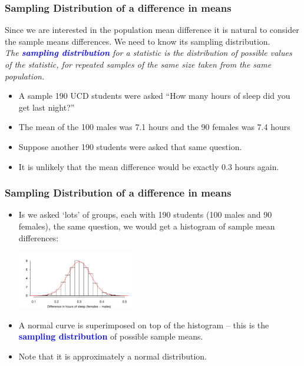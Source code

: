 \documentclass[12pt,xcolor=dvipsnames,handout,mathserif,aspectratio=169]{beamer}
\newcommand{\tcb}{\textcolor{blue}}
\begin{document}
\begin{frame}
\frametitle{Sampling Distribution of a difference in means}
Since we are interested in the population mean difference it is natural to consider the sample means differences. We need to know its sampling distribution.\\
\vspace*{0.2cm}
\emph{The \textbf{\tcb{sampling distribution}} for a statistic is the distribution of possible values 
of the statistic, for repeated samples of the same size taken from the same population.}\\
\vspace*{0.2cm}
\begin{itemize}
\item A sample 190 UCD students were asked ``How many hours of sleep did you 
get last night?''
\item The mean of the 100 males was 7.1 hours and the 90 females was 7.4 hours
\item Suppose another 190 students were asked that same question. 
\item It is unlikely that the mean difference would be exactly 0.3 hours again.
\end{itemize}
\end{frame}

\begin{frame}
\frametitle{Sampling Distribution of a difference in means}
\begin{itemize}
\item Is we asked `lots' of groups, each with 190 students (100 males and 90 females), the same question, we would get a histogram  of sample mean differences:

\begin{center} 
\includegraphics[width=0.4\textwidth]{SamplingDistribution.pdf}\\
\end{center}

\item A normal curve is superimposed on top of the histogram -- this is the \textbf{\tcb{sampling distribution}} of possible sample means. 
\item Note that it is approximately a normal distribution. 
\end{itemize}
\end{frame}
\end{document}
